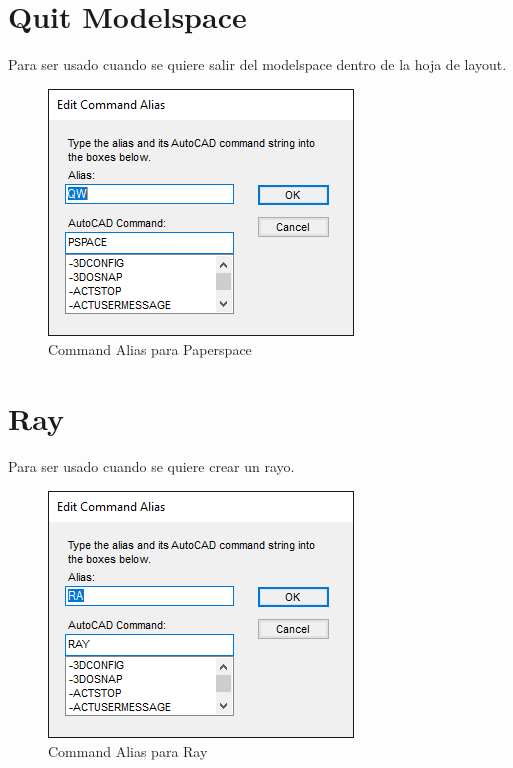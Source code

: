 \documentclass{report}
\begin{document}
\section{Quit Modelspace}

Para ser usado cuando se quiere salir del modelspace dentro de la hoja de layout.

\begin{figure}[H]
	\centering
	\includegraphics[width=0.7\linewidth, height=0.45\textheight,keepaspectratio]{Imagenes/autocad_alias_quitmodelspace}
	\caption{Command Alias para Paperspace}
	\label{fig:autocadaliasquitmodelspace}
\end{figure}

\section{Ray}

Para ser usado cuando se quiere crear un rayo.

\begin{figure}[H]
	\centering
	\includegraphics[width=0.7\linewidth, height=0.45\textheight,keepaspectratio]{Imagenes/autocad_alias_ray}
	\caption{Command Alias para Ray}
	\label{fig:autocadaliasray}
\end{figure}
\end{document}
